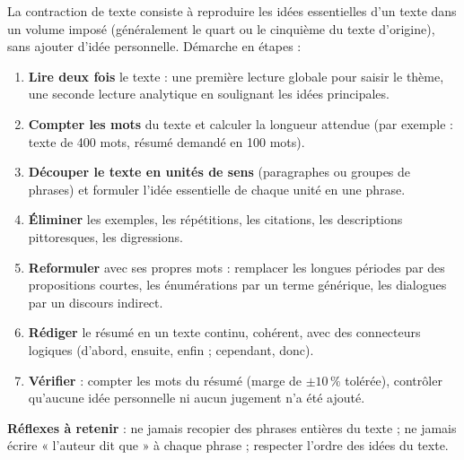 \documentclass[11pt]{article}
\newcommand{\cle}[1]{{\popxbold\color{popdark}#1}}
\begin{document}
\begin{methode}
La \cle{contraction de texte} consiste à reproduire les idées essentielles d'un texte dans un volume imposé (généralement le quart ou le cinquième du texte d'origine), sans ajouter d'idée personnelle. Démarche en étapes :
\begin{enumerate}
\item \textbf{Lire deux fois} le texte : une première lecture globale pour saisir le thème, une seconde lecture analytique en soulignant les idées principales.
\item \textbf{Compter les mots} du texte et calculer la longueur attendue (par exemple : texte de 400 mots, résumé demandé en 100 mots).
\item \textbf{Découper le texte en unités de sens} (paragraphes ou groupes de phrases) et formuler l'idée essentielle de chaque unité en une phrase.
\item \textbf{Éliminer} les exemples, les répétitions, les citations, les descriptions pittoresques, les digressions.
\item \textbf{Reformuler} avec ses propres mots : remplacer les longues périodes par des propositions courtes, les énumérations par un terme générique, les dialogues par un discours indirect.
\item \textbf{Rédiger} le résumé en un texte continu, cohérent, avec des connecteurs logiques (d'abord, ensuite, enfin ; cependant, donc).
\item \textbf{Vérifier} : compter les mots du résumé (marge de $\pm 10\,\%$ tolérée), contrôler qu'aucune idée personnelle ni aucun jugement n'a été ajouté.
\end{enumerate}
\textbf{Réflexes à retenir} : ne jamais recopier des phrases entières du texte ; ne jamais écrire « l'auteur dit que » à chaque phrase ; respecter l'ordre des idées du texte.
\end{methode}
\end{document}
